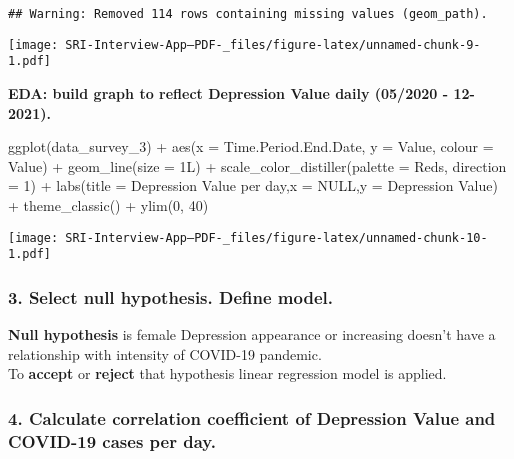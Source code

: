 \documentclass[
]{article}
\newenvironment{Shaded}{\begin{snugshade}}{\end{snugshade}}
\newcommand{\AttributeTok}[1]{\textcolor[rgb]{0.77,0.63,0.00}{#1}}
\newcommand{\ConstantTok}[1]{\textcolor[rgb]{0.00,0.00,0.00}{#1}}
\newcommand{\DecValTok}[1]{\textcolor[rgb]{0.00,0.00,0.81}{#1}}
\newcommand{\FunctionTok}[1]{\textcolor[rgb]{0.00,0.00,0.00}{#1}}
\newcommand{\NormalTok}[1]{#1}
\newcommand{\SpecialCharTok}[1]{\textcolor[rgb]{0.00,0.00,0.00}{#1}}
\newcommand{\StringTok}[1]{\textcolor[rgb]{0.31,0.60,0.02}{#1}}
\begin{document}
\begin{verbatim}
## Warning: Removed 114 rows containing missing values (geom_path).
\end{verbatim}

\texttt{[image: SRI-Interview-App--PDF-\_files/figure-latex/unnamed-chunk-9-1.pdf]}

\textbf{EDA: build graph to reflect Depression Value daily (05/2020 -
12-2021).}

\begin{Shaded}
\begin{Highlighting}[]
\FunctionTok{ggplot}\NormalTok{(data\_survey\_3) }\SpecialCharTok{+}
  \FunctionTok{aes}\NormalTok{(}\AttributeTok{x =}\NormalTok{ Time.Period.End.Date, }\AttributeTok{y =}\NormalTok{ Value, }\AttributeTok{colour =}\NormalTok{ Value) }\SpecialCharTok{+}
  \FunctionTok{geom\_line}\NormalTok{(}\AttributeTok{size =}\NormalTok{ 1L) }\SpecialCharTok{+}
  \FunctionTok{scale\_color\_distiller}\NormalTok{(}\AttributeTok{palette =} \StringTok{\textquotesingle{}Reds\textquotesingle{}}\NormalTok{, }\AttributeTok{direction =} \DecValTok{1}\NormalTok{) }\SpecialCharTok{+}
  \FunctionTok{labs}\NormalTok{(}\AttributeTok{title =} \StringTok{\textquotesingle{}Depression Value per day\textquotesingle{}}\NormalTok{,}\AttributeTok{x =} \ConstantTok{NULL}\NormalTok{,}\AttributeTok{y =} \StringTok{\textquotesingle{}Depression Value\textquotesingle{}}\NormalTok{) }\SpecialCharTok{+}
  \FunctionTok{theme\_classic}\NormalTok{() }\SpecialCharTok{+}
  \FunctionTok{ylim}\NormalTok{(}\DecValTok{0}\NormalTok{, }\DecValTok{40}\NormalTok{)}
\end{Highlighting}
\end{Shaded}

\texttt{[image: SRI-Interview-App--PDF-\_files/figure-latex/unnamed-chunk-10-1.pdf]}

\hypertarget{select-null-hypothesis.-define-model.}{%
\subsubsection{3. Select null hypothesis. Define
model.}\label{select-null-hypothesis.-define-model.}}

\textbf{Null hypothesis} is female Depression appearance or increasing
doesn't have a relationship with intensity of COVID-19 pandemic.\\
To \textbf{accept} or \textbf{reject} that hypothesis linear regression
model is applied.

\hypertarget{calculate-correlation-coefficient-of-depression-value-and-covid-19-cases-per-day.}{%
\subsubsection{4. Calculate correlation coefficient of Depression Value
and COVID-19 cases per
day.}\label{calculate-correlation-coefficient-of-depression-value-and-covid-19-cases-per-day.}}
\end{document}
